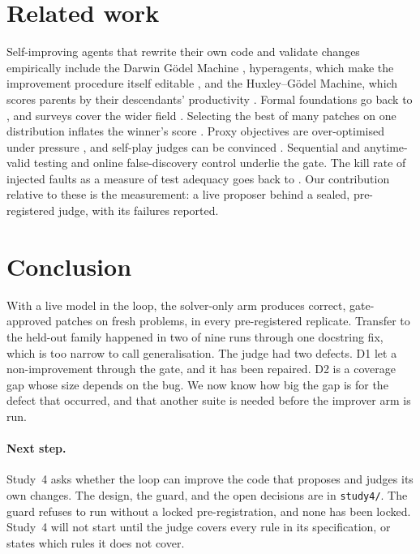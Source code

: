 \documentclass[11pt]{article}
\begin{document}
\section{Related work}

Self-improving agents that rewrite their own code and validate changes empirically include the Darwin G\"odel Machine \citep{zhang2025dgm}, hyperagents, which make the improvement procedure itself editable \citep{zhang2026hyperagents}, and the Huxley--G\"odel Machine, which scores parents by their descendants' productivity \citep{wang2026hgm}. Formal foundations go back to \citet{schmidhuber2007godel}, and surveys cover the wider field \citep{chen2026rsi}.
Selecting the best of many patches on one distribution inflates the winner's score \citep{dwork2015holdout}. Proxy objectives are over-optimised under pressure \citep{gao2023scaling,coste2024ensembles}, and self-play judges can be convinced \citep{zhou2026convincing}.
Sequential and anytime-valid testing \citep{ramdas2023gtsavi,wald1945sprt} and online false-discovery control \citep{xu2024elond} underlie the gate. The kill rate of injected faults as a measure of test adequacy goes back to \citet{demillo1978mutation}.
Our contribution relative to these is the measurement: a live proposer behind a sealed, pre-registered judge, with its failures reported.

\section{Conclusion}

With a live model in the loop, the solver-only arm produces correct, gate-approved patches on fresh problems, in every pre-registered replicate. Transfer to the held-out family happened in two of nine runs through one docstring fix, which is too narrow to call generalisation.
The judge had two defects. D1 let a non-improvement through the gate, and it has been repaired. D2 is a coverage gap whose size depends on the bug. We now know how big the gap is for the defect that occurred, and that another suite is needed before the improver arm is run.

\paragraph{Next step.} Study~4 asks whether the loop can improve the code that proposes and judges its own changes. The design, the guard, and the open decisions are in \texttt{study4/}. The guard refuses to run without a locked pre-registration, and none has been locked. Study~4 will not start until the judge covers every rule in its specification, or states which rules it does not cover.
\end{document}
